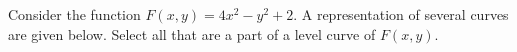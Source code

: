 \documentclass{ximera}
\author{Jim Talamo}
\begin{document}
\begin{exercise}
 
Consider the function $F(x,y) = 4x^2-y^2+2$.  A representation of several curves are given below.  Select all that are a part of a level curve of $F(x,y)$.

\begin{selectAll}
\end{selectAll}  

\end{exercise}
\end{document}
